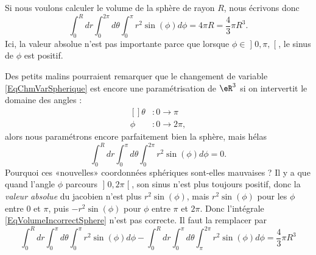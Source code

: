 Si nous voulons calculer le volume de la sphère de rayon $R$, nous écrivons donc
\begin{equation}
	\int_0^Rdr\int_{0}^{2\pi}d\theta\int_0^{\pi}r^2 \sin(\phi)d\phi=4\pi R=\frac{ 4 }{ 3 }\pi R^3.
\end{equation}
Ici, la valeur absolue n'est pas importante parce que lorsque $\phi\in\mathopen] 0,\pi ,  \mathclose[$, le sinus de $\phi$ est positif.

Des petits malins pourraient remarquer que le changement de variable \eqref{EqChmVarSpherique} est encore une paramétrisation de $\eR^3$ si on intervertit le domaine des angles :
\begin{equation}
	\begin{aligned}[]
		\theta&\colon 0 \to \pi\\
		\phi	&\colon 0\to 2\pi,
	\end{aligned}
\end{equation}
alors nous paramétrons encore parfaitement bien la sphère, mais hélas
\begin{equation}		\label{EqVolumeIncorrectSphere}
	\int_0^Rdr\int_{0}^{\pi}d\theta\int_0^{2\pi}r^2 \sin(\phi)d\phi=0.
\end{equation}
Pourquoi ces «nouvelles» coordonnées sphériques sont-elles mauvaises ? Il y a que quand l'angle $\phi$ parcours $\mathopen] 0 , 2\pi \mathclose[$, son sinus n'est plus toujours positif, donc la \emph{valeur absolue} du jacobien n'est plus $r^2\sin(\phi)$, mais $r^2\sin(\phi)$ pour les $\phi$ entre $0$ et $\pi$, puis $-r^2\sin(\phi)$ pour $\phi$ entre $\pi$ et $2\pi$. Donc l'intégrale \eqref{EqVolumeIncorrectSphere} n'est pas correcte. Il faut la remplacer par
\begin{equation}
	\int_0^Rdr\int_{0}^{\pi}d\theta\int_0^{\pi}r^2 \sin(\phi)d\phi- \int_0^Rdr\int_{0}^{\pi}d\theta\int_{\pi}^{2\pi}r^2 \sin(\phi)d\phi = \frac{ 4 }{ 3 }\pi R^3
\end{equation}
